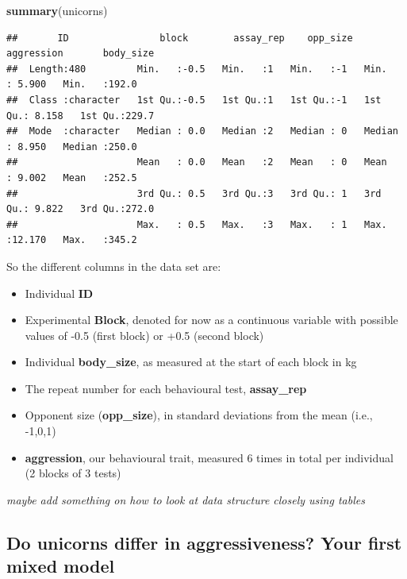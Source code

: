 \documentclass[
  12pt,
]{book}
\newenvironment{Shaded}{\begin{snugshade}}{\end{snugshade}}
\newcommand{\KeywordTok}[1]{\textcolor[rgb]{0.13,0.29,0.53}{\textbf{#1}}}
\newcommand{\NormalTok}[1]{#1}
\providecommand{\tightlist}{%
  \setlength{\itemsep}{0pt}\setlength{\parskip}{0pt}}
\begin{document}
\begin{Shaded}
\begin{Highlighting}[]
\KeywordTok{summary}\NormalTok{(unicorns)}
\end{Highlighting}
\end{Shaded}

\begin{verbatim}
##       ID                block        assay_rep    opp_size    aggression       body_size    
##  Length:480         Min.   :-0.5   Min.   :1   Min.   :-1   Min.   : 5.900   Min.   :192.0  
##  Class :character   1st Qu.:-0.5   1st Qu.:1   1st Qu.:-1   1st Qu.: 8.158   1st Qu.:229.7  
##  Mode  :character   Median : 0.0   Median :2   Median : 0   Median : 8.950   Median :250.0  
##                     Mean   : 0.0   Mean   :2   Mean   : 0   Mean   : 9.002   Mean   :252.5  
##                     3rd Qu.: 0.5   3rd Qu.:3   3rd Qu.: 1   3rd Qu.: 9.822   3rd Qu.:272.0  
##                     Max.   : 0.5   Max.   :3   Max.   : 1   Max.   :12.170   Max.   :345.2
\end{verbatim}

So the different columns in the data set are:

\begin{itemize}
\tightlist
\item
  Individual \textbf{ID}
\item
  Experimental \textbf{Block}, denoted for now as a continuous variable with possible values of -0.5 (first block) or +0.5 (second block)
\item
  Individual \textbf{body\_size}, as measured at the start of each block in kg
\item
  The repeat number for each behavioural test, \textbf{assay\_rep}
\item
  Opponent size (\textbf{opp\_size}), in standard deviations from the mean (i.e., -1,0,1)
\item
  \textbf{aggression}, our behavioural trait, measured 6 times in total per individual (2 blocks of 3 tests)
\end{itemize}

\emph{maybe add something on how to look at data structure closely using tables}

\hypertarget{do-unicorns-differ-in-aggressiveness-your-first-mixed-model}{%
\subsection{Do unicorns differ in aggressiveness? Your first mixed model}\label{do-unicorns-differ-in-aggressiveness-your-first-mixed-model}}
\end{document}
